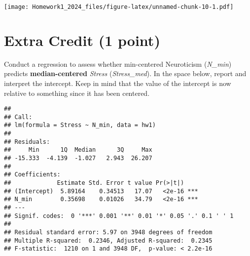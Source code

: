 \documentclass[
]{article}
\newenvironment{Shaded}{\begin{snugshade}}{\end{snugshade}}
\newcommand{\AttributeTok}[1]{\textcolor[rgb]{0.13,0.29,0.53}{#1}}
\newcommand{\DocumentationTok}[1]{\textcolor[rgb]{0.56,0.35,0.01}{\textbf{\textit{#1}}}}
\newcommand{\FunctionTok}[1]{\textcolor[rgb]{0.13,0.29,0.53}{\textbf{#1}}}
\newcommand{\NormalTok}[1]{#1}
\newcommand{\OtherTok}[1]{\textcolor[rgb]{0.56,0.35,0.01}{#1}}
\newcommand{\SpecialCharTok}[1]{\textcolor[rgb]{0.81,0.36,0.00}{\textbf{#1}}}
\begin{document}
\texttt{[image: Homework1\_2024\_files/figure-latex/unnamed-chunk-10-1.pdf]}

\hypertarget{extra-credit-1-point}{%
\section{\texorpdfstring{Extra Credit \textbf{(1
point)}}{Extra Credit (1 point)}}\label{extra-credit-1-point}}

Conduct a regression to assess whether min-centered Neuroticism
(\emph{N\_min}) predicts \textbf{median-centered} \emph{Stress}
(\emph{Stress\_med}). In the space below, report and interpret the
intercept. Keep in mind that the value of the intercept is now relative
to something since it has been centered.

\begin{Shaded}
\end{Shaded}

\begin{verbatim}
## 
## Call:
## lm(formula = Stress ~ N_min, data = hw1)
## 
## Residuals:
##     Min      1Q  Median      3Q     Max 
## -15.333  -4.139  -1.027   2.943  26.207 
## 
## Coefficients:
##             Estimate Std. Error t value Pr(>|t|)    
## (Intercept)  5.89164    0.34513   17.07   <2e-16 ***
## N_min        0.35698    0.01026   34.79   <2e-16 ***
## ---
## Signif. codes:  0 '***' 0.001 '**' 0.01 '*' 0.05 '.' 0.1 ' ' 1
## 
## Residual standard error: 5.97 on 3948 degrees of freedom
## Multiple R-squared:  0.2346, Adjusted R-squared:  0.2345 
## F-statistic:  1210 on 1 and 3948 DF,  p-value: < 2.2e-16
\end{verbatim}
\end{document}
